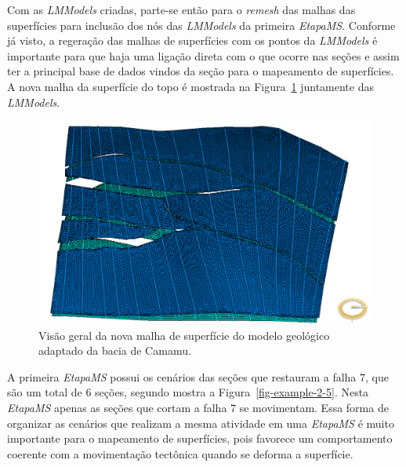 Com as \textit{LMModels} criadas, parte-se então para o \textit{remesh} das malhas das superfícies para inclusão dos nós das \textit{LMModels} da primeira \textit{EtapaMS}. Conforme já visto, a regeração das malhas de superfícies com os pontos da \textit{LMModels} é importante para que haja uma ligação direta com o que ocorre nas seções e assim ter a principal base de dados vindos da seção para o mapeamento de superfícies. A nova malha da superfície do topo é mostrada na Figura~\ref{fig-example-2-4} juntamente das \textit{LMModels}.

\begin{figure} [h]
  \begin{center}
    \includegraphics[width=\textwidth]{images/fig-example-2-3}
    \caption{Visão geral da nova malha de superfície do modelo geológico adaptado da bacia de Camamu.}\label{fig-example-2-4}
  \end{center}
\end{figure}

A primeira \textit{EtapaMS} possui os cenários das seções que restauram a falha 7, que são um total de 6 seções, segundo mostra a Figura~\ref{fig-example-2-5}. Nesta \textit{EtapaMS} apenas as seções que cortam a falha 7 se movimentam. Essa forma de organizar as cenários que realizam a mesma atividade em uma \textit{EtapaMS} é muito importante para o mapeamento de superfícies, pois favorece um comportamento coerente com a movimentação tectônica quando se deforma a superfície.

